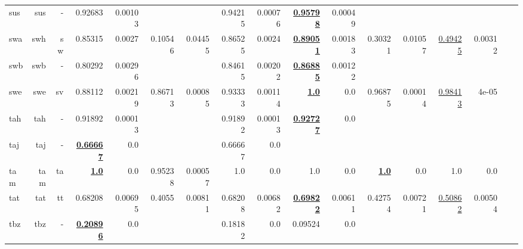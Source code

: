 \documentclass[11pt]{article}
\begin{document}
\begin{table*}[h]
{\begin{tabular}{lrrrrrrrrrrrrrrrr}
sus         & sus         & -         & 0.92683         & 0.00103         &          &          & 0.94215         & 0.00076         & \textbf{\underline{0.95798}}         & 0.00049         &          &          &          &          \\
swa         & swh         & sw         & 0.85315         & 0.0027         & 0.10546         & 0.04455         & 0.86525         & 0.0024         & \textbf{\underline{0.89051}}         & 0.00183         & 0.30321         & 0.01057         & \underline{0.49425}         & 0.00312         \\
swb         & swb         & -         & 0.80292         & 0.00296         &          &          & 0.84615         & 0.00202         & \textbf{\underline{0.86885}}         & 0.00122         &          &          &          &          \\
swe         & swe         & sv         & 0.88112         & 0.00219         & 0.86713         & 0.00085         & 0.93333         & 0.00114         & \textbf{\underline{1.0}}         & 0.0         & 0.96875         & 0.00014         & \underline{0.98413}         & 4e-05         \\
tah         & tah         & -         & 0.91892         & 0.00013         &          &          & 0.91892         & 0.00013         & \textbf{\underline{0.92727}}         & 0.0         &          &          &          &          \\
taj         & taj         & -         & \textbf{\underline{0.66667}}         & 0.0         &          &          & 0.66667         & 0.0         &          &          &          &          &          &          \\
tam         & tam         & ta         & \textbf{\underline{1.0}}         & 0.0         & 0.95238         & 0.00057         & 1.0         & 0.0         & 1.0         & 0.0         & \textbf{\underline{1.0}}         & 0.0         & 1.0         & 0.0         \\
tat         & tat         & tt         & 0.68208         & 0.00695         & 0.4055         & 0.00811         & 0.68208         & 0.00682         & \textbf{\underline{0.69822}}         & 0.00611         & 0.42754         & 0.00721         & \underline{0.50862}         & 0.00504         \\
tbz         & tbz         & -         & \textbf{\underline{0.20896}}         & 0.0         &          &          & 0.18182         & 0.0         & 0.09524         & 0.0         &          &          &          &          \\

\end{tabular}}
\end{table*}
\end{document}
